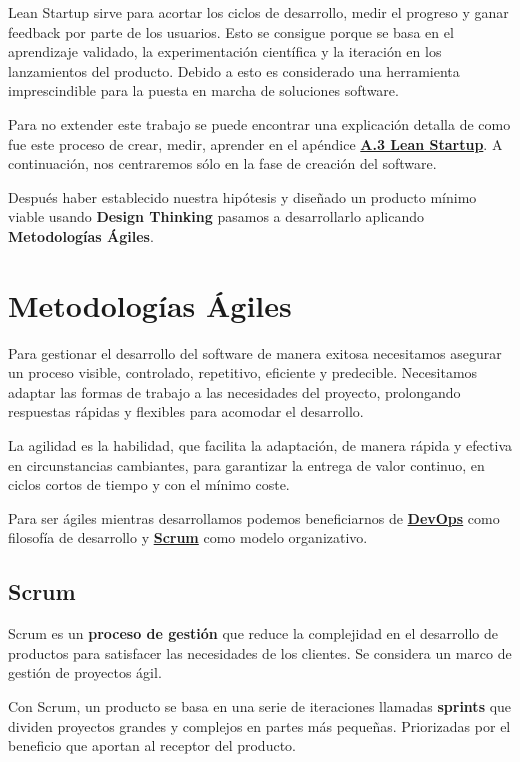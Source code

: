 \documentclass[12pt,twoside,titlepage]{report}
\begin{document}
Lean Startup sirve para acortar los ciclos de desarrollo, medir el progreso y ganar feedback por parte de los usuarios. Esto se consigue porque se basa en el aprendizaje validado, la experimentación científica y la iteración en los lanzamientos del producto. 
Debido a esto es considerado una herramienta imprescindible para la puesta en marcha de soluciones software. 

Para no extender este trabajo se puede encontrar una explicación detalla de como fue este proceso de crear, medir, aprender en el apéndice \hyperref[sec:LeanStartup]{\textbf{A.3 Lean Startup}}. A continuación, nos centraremos sólo en la fase de creación del software.
\cite{leanstartup2}

Después haber establecido nuestra hipótesis y diseñado un producto mínimo viable usando \textbf{Design Thinking} pasamos a desarrollarlo aplicando \textbf{Metodologías Ágiles}.

\chapter{Metodologías Ágiles}
\label{sec:agile}
Para gestionar el desarrollo del software de manera exitosa necesitamos asegurar un proceso visible, controlado, repetitivo, eficiente y predecible. Necesitamos adaptar las formas de trabajo a las necesidades del proyecto, prolongando respuestas rápidas y flexibles para acomodar el desarrollo.

La agilidad es la habilidad, que facilita la adaptación, de manera rápida y efectiva en circunstancias cambiantes, para garantizar la entrega de valor continuo, en ciclos cortos de tiempo y con el mínimo coste. \cite{manifiestoAgil} %

Para ser ágiles mientras desarrollamos podemos beneficiarnos de \hyperref[sec:DevOps]{\textbf{DevOps}} como filosofía de desarrollo y \hyperref[sec:Scrum]{\textbf{Scrum}} como modelo organizativo.
\cite{agile}

\section{Scrum}
\label{sec:Scrum}

Scrum es un \textbf{proceso de gestión} que reduce la complejidad en el desarrollo de productos para satisfacer las necesidades de los clientes. Se considera un marco de gestión de proyectos ágil.

Con Scrum, un producto se basa en una serie de iteraciones llamadas \textbf{sprints} que dividen proyectos grandes y complejos en partes más pequeñas. Priorizadas por el beneficio que aportan al receptor del producto.
\cite{scrum1}
\end{document}
